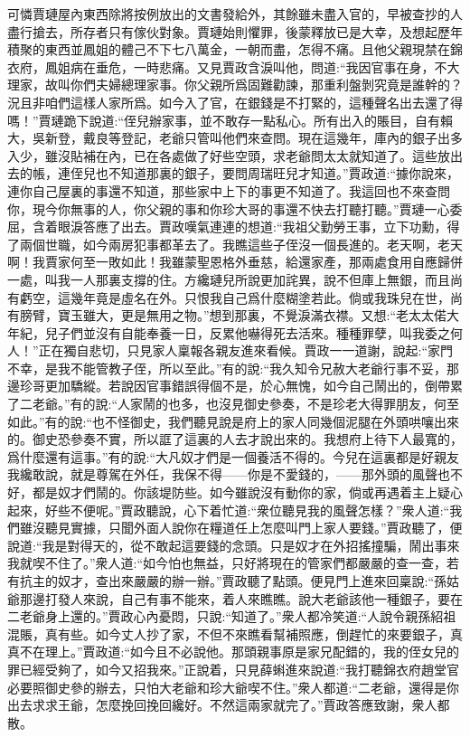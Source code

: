 \begin{parag}
    可憐賈璉屋內東西除將按例放出的文書發給外，其餘雖未盡入官的，早被查抄的人盡行搶去，所存者只有傢伙對象。賈璉始則懼罪，後蒙釋放已是大幸，及想起歷年積聚的東西並鳳姐的體己不下七八萬金，一朝而盡，怎得不痛。且他父親現禁在錦衣府，鳳姐病在垂危，一時悲痛。又見賈政含淚叫他，問道:“我因官事在身，不大理家，故叫你們夫婦總理家事。你父親所爲固難勸諫，那重利盤剝究竟是誰幹的？況且非咱們這樣人家所爲。如今入了官，在銀錢是不打緊的，這種聲名出去還了得嗎！”賈璉跪下說道:“侄兒辦家事，並不敢存一點私心。所有出入的賬目，自有賴大，吳新登，戴良等登記，老爺只管叫他們來查問。現在這幾年，庫內的銀子出多入少，雖沒貼補在內，已在各處做了好些空頭，求老爺問太太就知道了。這些放出去的帳，連侄兒也不知道那裏的銀子，要問周瑞旺兒才知道。”賈政道:“據你說來，連你自己屋裏的事還不知道，那些家中上下的事更不知道了。我這回也不來查問你，現今你無事的人，你父親的事和你珍大哥的事還不快去打聽打聽。”賈璉一心委屈，含着眼淚答應了出去。賈政嘆氣連連的想道:“我祖父勤勞王事，立下功勳，得了兩個世職，如今兩房犯事都革去了。我瞧這些子侄沒一個長進的。老天啊，老天啊！我賈家何至一敗如此！我雖蒙聖恩格外垂慈，給還家產，那兩處食用自應歸併一處，叫我一人那裏支撐的住。方纔璉兒所說更加詫異，說不但庫上無銀，而且尚有虧空，這幾年竟是虛名在外。只恨我自己爲什麼糊塗若此。倘或我珠兒在世，尚有膀臂，寶玉雖大，更是無用之物。”想到那裏，不覺淚滿衣襟。又想:“老太太偌大年紀，兒子們並沒有自能奉養一日，反累他嚇得死去活來。種種罪孽，叫我委之何人！”正在獨自悲切，只見家人稟報各親友進來看候。賈政一一道謝，說起:“家門不幸，是我不能管教子侄，所以至此。”有的說:“我久知令兄赦大老爺行事不妥，那邊珍哥更加驕縱。若說因官事錯誤得個不是，於心無愧，如今自己鬧出的，倒帶累了二老爺。”有的說:“人家鬧的也多，也沒見御史參奏，不是珍老大得罪朋友，何至如此。”有的說:“也不怪御史，我們聽見說是府上的家人同幾個泥腿在外頭哄嚷出來的。御史恐參奏不實，所以誆了這裏的人去才說出來的。我想府上待下人最寬的，爲什麼還有這事。”有的說:“大凡奴才們是一個養活不得的。今兒在這裏都是好親友我纔敢說，就是尊駕在外任，我保不得——你是不愛錢的，——那外頭的風聲也不好，都是奴才們鬧的。你該堤防些。如今雖說沒有動你的家，倘或再遇着主上疑心起來，好些不便呢。”賈政聽說，心下着忙道:“衆位聽見我的風聲怎樣？”衆人道:“我們雖沒聽見實據，只聞外面人說你在糧道任上怎麼叫門上家人要錢。”賈政聽了，便說道:“我是對得天的，從不敢起這要錢的念頭。只是奴才在外招搖撞騙，鬧出事來我就喫不住了。”衆人道:“如今怕也無益，只好將現在的管家們都嚴嚴的查一查，若有抗主的奴才，查出來嚴嚴的辦一辦。”賈政聽了點頭。便見門上進來回稟說:“孫姑爺那邊打發人來說，自己有事不能來，着人來瞧瞧。說大老爺該他一種銀子，要在二老爺身上還的。”賈政心內憂悶，只說:“知道了。”衆人都冷笑道:“人說令親孫紹祖混賬，真有些。如今丈人抄了家，不但不來瞧看幫補照應，倒趕忙的來要銀子，真真不在理上。”賈政道:“如今且不必說他。那頭親事原是家兄配錯的，我的侄女兒的罪已經受夠了，如今又招我來。”正說着，只見薛蝌進來說道:“我打聽錦衣府趙堂官必要照御史參的辦去，只怕大老爺和珍大爺喫不住。”衆人都道:“二老爺，還得是你出去求求王爺，怎麼挽回挽回纔好。不然這兩家就完了。”賈政答應致謝，衆人都散。
\end{parag}


